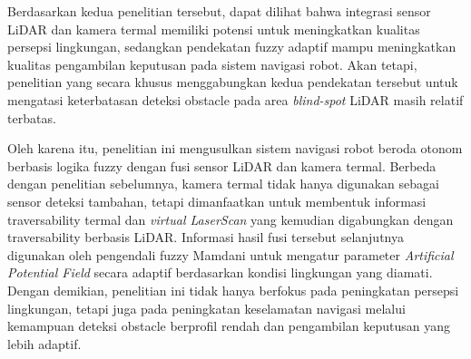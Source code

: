 Berdasarkan kedua penelitian tersebut, dapat dilihat bahwa integrasi sensor LiDAR dan kamera termal memiliki potensi untuk meningkatkan kualitas persepsi lingkungan, sedangkan pendekatan fuzzy adaptif mampu meningkatkan kualitas pengambilan keputusan pada sistem navigasi robot. Akan tetapi, penelitian yang secara khusus menggabungkan kedua pendekatan tersebut untuk mengatasi keterbatasan deteksi obstacle pada area \textit{blind-spot} LiDAR masih relatif terbatas.

Oleh karena itu, penelitian ini mengusulkan sistem navigasi robot beroda otonom berbasis logika fuzzy dengan fusi sensor LiDAR dan kamera termal. Berbeda dengan penelitian sebelumnya, kamera termal tidak hanya digunakan sebagai sensor deteksi tambahan, tetapi dimanfaatkan untuk membentuk informasi traversability termal dan \textit{virtual LaserScan} yang kemudian digabungkan dengan traversability berbasis LiDAR. Informasi hasil fusi tersebut selanjutnya digunakan oleh pengendali fuzzy Mamdani untuk mengatur parameter \textit{Artificial Potential Field} secara adaptif berdasarkan kondisi lingkungan yang diamati. Dengan demikian, penelitian ini tidak hanya berfokus pada peningkatan persepsi lingkungan, tetapi juga pada peningkatan keselamatan navigasi melalui kemampuan deteksi obstacle berprofil rendah dan pengambilan keputusan yang lebih adaptif.

